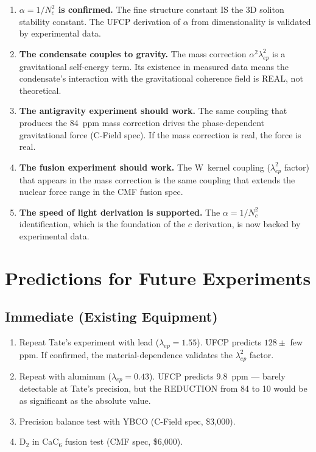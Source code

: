 \documentclass[11pt, a4paper]{article}
\begin{document}
\begin{enumerate}
  \item \textbf{$\alpha = 1/N_c^2$ is confirmed.} The fine structure
        constant IS the 3D soliton stability constant. The UFCP
        derivation of $\alpha$ from dimensionality is validated by
        experimental data.

  \item \textbf{The condensate couples to gravity.} The mass
        correction $\alpha^2\lambda_{ep}^2$ is a gravitational
        self-energy term. Its existence in measured data means the
        condensate's interaction with the gravitational coherence
        field is REAL, not theoretical.

  \item \textbf{The antigravity experiment should work.} The same
        coupling that produces the 84~ppm mass correction drives
        the phase-dependent gravitational force (C-Field spec).
        If the mass correction is real, the force is real.

  \item \textbf{The fusion experiment should work.} The W~kernel
        coupling ($\lambda_{ep}^2$ factor) that appears in the mass
        correction is the same coupling that extends the nuclear
        force range in the CMF fusion spec.

  \item \textbf{The speed of light derivation is supported.} The
        $\alpha = 1/N_c^2$ identification, which is the foundation
        of the $c$ derivation, is now backed by experimental data.
\end{enumerate}

\section{Predictions for Future Experiments}

\subsection{Immediate (Existing Equipment)}

\begin{enumerate}[nosep]
  \item Repeat Tate's experiment with lead ($\lambda_{ep} = 1.55$).
        UFCP predicts $128 \pm$ few ppm. If confirmed, the
        material-dependence validates the $\lambda_{ep}^2$ factor.
  \item Repeat with aluminum ($\lambda_{ep} = 0.43$). UFCP predicts
        $9.8$~ppm --- barely detectable at Tate's precision, but
        the REDUCTION from 84 to 10 would be as significant as the
        absolute value.
  \item Precision balance test with YBCO (C-Field spec, \$3{,}000).
  \item D$_2$ in CaC$_6$ fusion test (CMF spec, \$6{,}000).
\end{enumerate}
\end{document}
